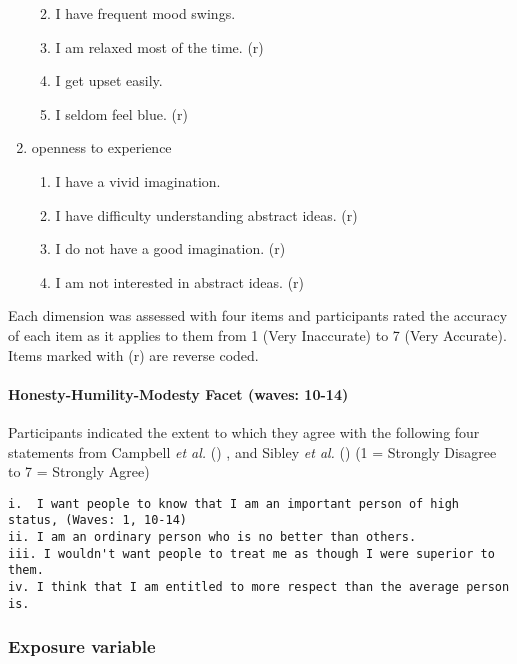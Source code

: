 \documentclass[
  singlecolumn]{article}
\let\oldparagraph\paragraph
\renewcommand{\paragraph}[1]{\oldparagraph{#1}\mbox{}}
\providecommand{\tightlist}{%
  \setlength{\itemsep}{0pt}\setlength{\parskip}{0pt}}\usepackage{longtable,booktabs,array}
\begin{document}
\begin{enumerate}
  \begin{enumerate}
  \def\labelenumii{\roman{enumii}.}
  \tightlist
  \item
    I have frequent mood swings.
  \item
    I am relaxed most of the time. (r)
  \item
    I get upset easily.
  \item
    I seldom feel blue. (r)
  \end{enumerate}
\item
  openness to experience

  \begin{enumerate}
  \def\labelenumii{\roman{enumii}.}
  \tightlist
  \item
    I have a vivid imagination.
  \item
    I have difficulty understanding abstract ideas. (r)
  \item
    I do not have a good imagination. (r)
  \item
    I am not interested in abstract ideas. (r)
  \end{enumerate}
\end{enumerate}

Each dimension was assessed with four items and participants rated the
accuracy of each item as it applies to them from 1 (Very Inaccurate) to
7 (Very Accurate). Items marked with (r) are reverse coded.

\paragraph{Honesty-Humility-Modesty Facet (waves:
10-14)}\label{honesty-humility-modesty-facet-waves-10-14}

Participants indicated the extent to which they agree with the following
four statements from Campbell \emph{et al.}
() , and Sibley \emph{et al.}
() (1 = Strongly Disagree to 7 = Strongly
Agree)

\begin{verbatim}
i.  I want people to know that I am an important person of high status, (Waves: 1, 10-14)
ii. I am an ordinary person who is no better than others.
iii. I wouldn't want people to treat me as though I were superior to them.
iv. I think that I am entitled to more respect than the average person is.
\end{verbatim}

\subsubsection{Exposure variable}\label{exposure-variable}
\end{document}
